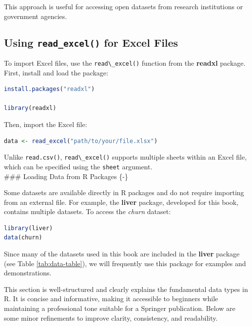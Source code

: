 \documentclass[
  11pt,
]{book}
\newcommand{\passthrough}[1]{#1}
\theoremstyle{definition}
\theoremstyle{definition}
\theoremstyle{definition}
\theoremstyle{definition}
\theoremstyle{remark}
\begin{document}
This approach is useful for accessing open datasets from research institutions or government agencies.

\subsection*{\texorpdfstring{Using \texttt{read\_excel()} for Excel Files}{Using read\_excel() for Excel Files}}\label{using-read_excel-for-excel-files}


To import Excel files, use the \passthrough{\lstinline!read\_excel()!} function from the \textbf{readxl} package. First, install and load the package:

\begin{lstlisting}[language=R]
install.packages("readxl")

library(readxl)
\end{lstlisting}

Then, import the Excel file:

\begin{lstlisting}[language=R]
data <- read_excel("path/to/your/file.xlsx")
\end{lstlisting}

Unlike \passthrough{\lstinline!read.csv()!}, \passthrough{\lstinline!read\_excel()!} supports multiple sheets within an Excel file, which can be specified using the \passthrough{\lstinline!sheet!} argument.\\
\#\#\# Loading Data from R Packages \{-\}

Some datasets are available directly in R packages and do not require importing from an external file. For example, the \textbf{liver} package, developed for this book, contains multiple datasets. To access the \emph{churn} dataset:

\begin{lstlisting}[language=R]
library(liver)
data(churn)
\end{lstlisting}

Since many of the datasets used in this book are included in the \textbf{liver} package (see Table \ref{tab:data-table}), we will frequently use this package for examples and demonstrations.

This section is well-structured and clearly explains the fundamental data types in R. It is concise and informative, making it accessible to beginners while maintaining a professional tone suitable for a Springer publication. Below are some minor refinements to improve clarity, consistency, and readability.
\end{document}
